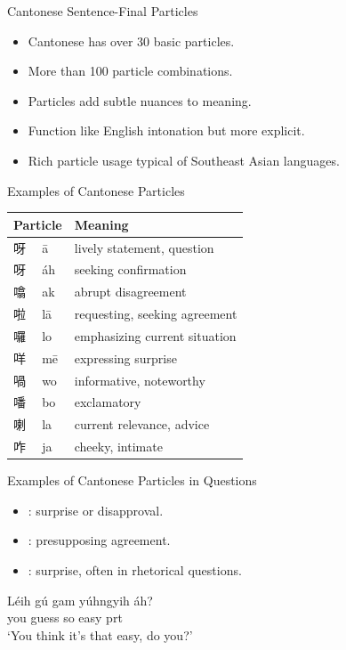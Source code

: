 \documentclass{beamer}
\newcommand{\cmn}{\mtciteform}
\begin{document}
\begin{frame}{Cantonese Sentence-Final Particles}
  \begin{itemize}
    \item Cantonese has over 30 basic particles.
    \item More than 100 particle combinations.
    \item Particles add subtle nuances to meaning.
    \item Function like English intonation but more explicit.
    \item Rich particle usage typical of Southeast Asian languages.
  \end{itemize}
 \end{frame}

\begin{frame}{Examples of Cantonese Particles}
  \begin{table}[h]
    \centering
\begin{tabular}{lll}
  \hline
   \multicolumn{2}{c}{Particle} & \textbf{Meaning} \\
  \hline
  呀 & ā & lively statement, question \\ 
  呀 & áh & seeking confirmation \\ 
  噏 & ak & abrupt disagreement \\ 
  啦 & lā & requesting, seeking agreement \\ 
  囉 & lo & emphasizing current situation \\ 
  咩 & mē & expressing surprise \\
  喎 & wo & informative, noteworthy \\ 
  噃 & bo & exclamatory \\ 
  喇 & la & current relevance, advice \\ 
  咋 & ja & cheeky, intimate \\ 
  \hline
\end{tabular}
  \end{table}
\end{frame}

\begin{frame}{Examples of Cantonese Particles in Questions}
  \begin{itemize}
    \item \cmn{áh}: surprise or disapproval.
    \item \cmn{há}: presupposing agreement.
    \item \cmn{mē}: surprise, often in rhetorical questions.
  \end{itemize}
  \begin{example}
    \gll Léih gú gam yúhngyih áh? \\
         you guess so easy prt \\
    \trans ‘You think it's that easy, do you?’
  \end{example}
\end{frame}
\end{document}
